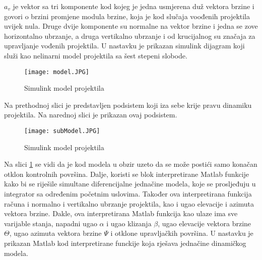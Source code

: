 $a_v$ je vektor sa tri komponente kod kojeg je jedna usmjerena duž vektora brzine i govori 
o brzini promjene modula brzine, koja je kod slučaja voođenih projektila uvijek nula. Druge dvije komponente 
su normalne na vektor brzine i jedna se zove horizontalno ubrzanje, a druga vertikalno ubrzanje 
i od krucijalnog su značaja za upravljanje vođenih projektila. 
U nastavku je prikazan simulink dijagram koji služi kao nelinarni model projektila sa 
šest stepeni slobode. 
\begin{figure}[!ht]
    \centering
    \texttt{[image: model.JPG]}
    \caption{Simulink model projektila}
\end{figure}
Na prethodnoj slici je predstavljen podsistem koji iza sebe krije pravu dinamiku projektila. 
Na narednoj slici je prikazan ovaj podsistem. 
\begin{figure}[!ht]
    \centering
    \texttt{[image: subModel.JPG]}
    \caption{Simulink model projektila}
    \label{fig:subimg}
\end{figure}
Na slici \ref{fig:subimg} se vidi da je kod modela u obzir uzeto da se može postići samo 
konačan otklon kontrolnih površina. Dalje, koristi se blok interpretirane Matlab funkcije 
kako bi se riješile simultane diferencijalne jednačine modela, koje se prosljeđuju 
u integrator sa određenim početnim uslovima. Također ova interpretirana funkcija računa 
i normalno i vertikalno ubrzanje projektila, kao i ugao elevacije i azimuta vektora brzine. Dakle,
ova interpretirana Matlab funkcija kao ulaze ima sve varijable stanja, napadni ugao $\alpha$ i ugao klizanja $\beta$, 
ugao elevacije vektora brzine $\Theta$, ugao azimuta vektora brzine $\Psi$ i otklone 
upravljačkih površina. U nastavku je prikazan Matlab kod interpretirane funckije koja 
rješava jednačine dinamičkog modela. 
